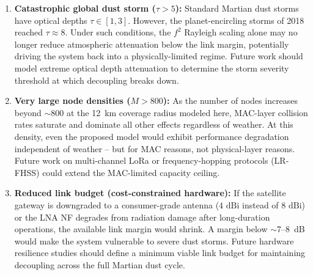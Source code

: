 \documentclass{ijuc}
\begin{document}
\begin{enumerate}
    \item \textbf{Catastrophic global dust storm ($\tau > 5$):} Standard Martian dust storms have optical depths $\tau \in [1, 3]$. However, the planet-encircling storms of 2018 reached $\tau \approx 8$. Under such conditions, the $f^2$ Rayleigh scaling alone may no longer reduce atmospheric attenuation below the link margin, potentially driving the system back into a physically-limited regime. Future work should model extreme optical depth attenuation to determine the storm severity threshold at which decoupling breaks down.

    \item \textbf{Very large node densities ($M > 800$):} As the number of nodes increases beyond $\sim$800 at the 12~km coverage radius modeled here, MAC-layer collision rates saturate and dominate all other effects regardless of weather. At this density, even the proposed model would exhibit performance degradation independent of weather -- but for MAC reasons, not physical-layer reasons. Future work on multi-channel LoRa or frequency-hopping protocols (LR-FHSS) \cite{alvarez2022uplink} could extend the MAC-limited capacity ceiling.

    \item \textbf{Reduced link budget (cost-constrained hardware):} If the satellite gateway is downgraded to a consumer-grade antenna ($4\text{ dBi}$ instead of $8\text{ dBi}$) or the LNA NF degrades from radiation damage after long-duration operations, the available link margin would shrink. A margin below $\sim$7--8~dB would make the system vulnerable to severe dust storms. Future hardware resilience studies should define a minimum viable link budget for maintaining decoupling across the full Martian dust cycle.
\end{enumerate}
\end{document}
